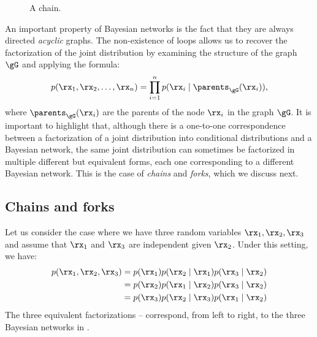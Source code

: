 \begin{figure}
    \centering
    \caption{A chain.}
    \label{fig:chain_bayesian_net}
\end{figure}
An important property of Bayesian networks is the fact that they are always directed \emph{acyclic} graphs. The non-existence of loops allows us to recover the factorization of the joint distribution by examining the structure of the graph $\gG$ and applying the formula:
\begin{equation}
    p(\rx_1, \rx_2, \dots, \rx_n) = \prod_{i=1}^n p(\rx_i \mid \parents_\gG(\rx_i)),
\end{equation}
where $\parents_\gG(\rx_i)$ are the parents of the node $\rx_i$ in the graph $\gG$. It is important to highlight that, although there is a one-to-one correspondence between a factorization of a joint distribution into conditional distributions and a Bayesian network, the same joint distribution can sometimes be factorized in multiple different but equivalent forms, each one corresponding to a different Bayesian network. This is the case of \emph{chains} and \emph{forks}, which we discuss next.

\subsection{Chains and forks}
\label{sec:chains_forks}
Let us consider the case where we have three random variables $\rx_1, \rx_2, \rx_3$ and assume that $\rx_1$ and $\rx_3$ are independent given $\rx_2$. Under this setting, we have:
\begin{align}
    p(\rx_1, \rx_2, \rx_3) &= p(\rx_1) p(\rx_2 \mid \rx_1) p(\rx_3 \mid \rx_2) \label{eq:chain}\\
    &= p(\rx_2) p(\rx_1 \mid \rx_2) p(\rx_3 \mid \rx_2) \label{eq:fork}\\
    &= p(\rx_3) p(\rx_2 \mid \rx_3) p(\rx_1 \mid \rx_2) \label{eq:reversed_chain}
\end{align}
The three equivalent factorizations  --  correspond, from left to right, to the three Bayesian networks in .

